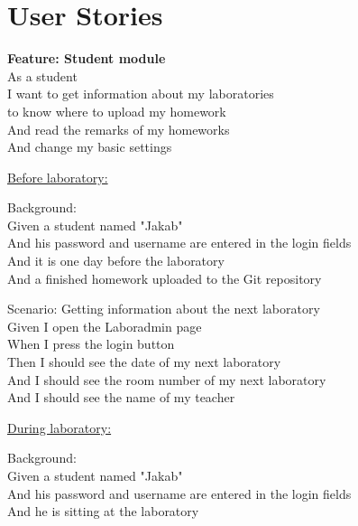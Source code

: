 \chapter{User Stories}
\label{user-stories}

\textbf{Feature: Student module}\\ \hspace*{1cm}
As a student\\ \hspace*{1cm}
I want to get information about my laboratories\\ \hspace*{1cm}
to know where to upload my homework\\ \hspace*{1cm}
And read the remarks of my homeworks\\ \hspace*{1cm}
And change my basic settings

\underline{Before laboratory:}

Background:\\ \hspace*{1cm}
Given a student named "Jakab"\\ \hspace*{1cm}
And his password and username are entered in the login fields\\ \hspace*{1cm}
And it is one day before the laboratory\\ \hspace*{1cm}
And a finished homework uploaded to the Git repository

Scenario: Getting information about the next laboratory\\ \hspace*{1cm}
Given I open the Laboradmin page\\ \hspace*{1cm}
When I press the login button\\ \hspace*{1cm}
Then I should see the date of my next laboratory\\ \hspace*{1cm}
And  I should see the room number of my next laboratory\\ \hspace*{1cm}
And I should see the name of my teacher

\underline{During laboratory:}

Background:\\ \hspace*{1cm}
Given a student named "Jakab"\\ \hspace*{1cm}
And his password and username are entered in the login fields\\ \hspace*{1cm}
And he is sitting at the laboratory

